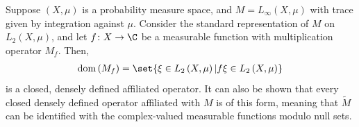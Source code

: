 \documentclass[10pt]{mypackage}
\begin{document}
\begin{example}
  Suppose $\left( X,\mu \right)$ is a probability measure space, and $M = L_{\infty}\left( X,\mu \right)$ with trace given by integration against $\mu$. Consider the standard representation of $M$ on $L_2\left( X,\mu \right)$, and let $f\colon X\rightarrow \C$ be a measurable function with multiplication operator $M_f$. Then, 
  \begin{align*}
    \operatorname{dom}\left( M_f \right) = \set{\xi\in L_2\left( X,\mu \right) | f\xi\in L_2\left( X,\mu \right)}
  \end{align*}
  is a closed, densely defined affiliated operator. It can also be shown that every closed densely defined operator affiliated with $M$ is of this form, meaning that $ \widetilde{M} $ can be identified with the complex-valued measurable functions modulo null sets.
\end{example}
\end{document}
